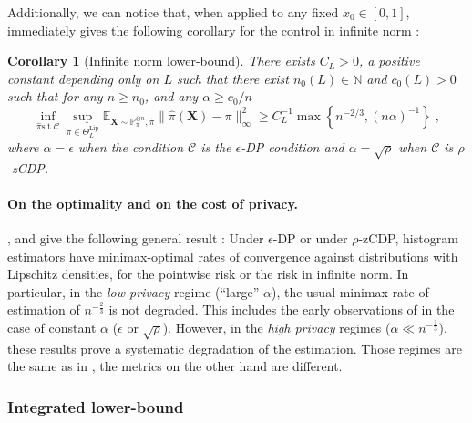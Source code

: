 \documentclass[10pt]{article} %
\newtheorem{corollary}{Corollary}
\newcommand{\N}[0]{\mathbb{N}}
\newcommand{\Prob}[0]{\mathbb{P}}
\newcommand{\E}[0]{\mathbb{E}}
\newcommand\vect[1]{\mathbf{#1}}
\newcommand\RG[1]{\textcolor{red}{#1}}
\newcommand\mRG[1]{\marginpar{\tiny\RG{#1}}}
\begin{document}
Additionally, we can notice that, when applied to any fixed $x_0 \in [0, 1]$,  immediately gives the following corollary for the control in infinite norm :

\begin{corollary}[Infinite norm lower-bound]
\label{cor:linfdp}
There exists $C_L>0$, a positive constant depending only on $L$ such that there exist $n_0(L) \in \N$ and $c_0(L) > 0$ such that for any $n \geq n_0$, and any 
$\alpha \geq c_0/n$
\begin{equation}
\label{eq:deftriangle}
    \inf_{\hat{\pi} \mathrm{ s.t. } \mathcal{C}} \sup_{\pi \in \Theta^{\mathrm{Lip}}_L}
    \E_{\vect{X} \sim \Prob_{\pi}^{\otimes n}, \hat{\pi}}\|\hat{\pi}(\vect{X})- \pi\|_{\infty}^2  \geq C_L^{-1} \max \left\{ n^{-2/3}, (n\alpha)^{-1} \right\}
    \;,
\end{equation}
where $\alpha = \epsilon$ when the condition $\mathcal{C}$ is the $\epsilon$-DP condition and $\alpha = \sqrt{\rho}$ when %
$\mathcal{C}$ is $\rho$-zCDP.
\end{corollary}

\paragraph{On the optimality and on the cost of privacy.}

,  and  give the following general result : Under $\epsilon$-DP or under $\rho$-zCDP, histogram estimators have minimax-optimal rates of convergence against distributions with Lipschitz densities, for the pointwise risk or the risk in infinite norm. In particular, in the \emph{low privacy} regime (``large'' $\alpha$), the usual minimax rate of estimation of $n^{-\frac{2}{3}}$ is not degraded. This includes the early observations of \citet{wasserman2010statistical} in the case of constant $\alpha$ ($\epsilon$ or $\sqrt{\rho}$). However, in the \emph{high privacy} regimes ($\alpha \ll n^{-\frac{1}{3}}$), these results prove a systematic degradation of the estimation. Those regimes are the same as in \citet{barber2014privacy}, the metrics on the other hand are different. %

\subsubsection{Integrated lower-bound} 
\end{document}
